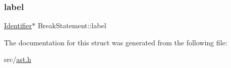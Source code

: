 \subsubsection{\texorpdfstring{label}{label}}
{\footnotesize\ttfamily \hyperlink{struct_identifier}{Identifier}$\ast$ Break\+Statement\+::label}



The documentation for this struct was generated from the following file\+:\begin{DoxyCompactItemize}
\item 
src/\hyperlink{ast_8h}{ast.\+h}\end{DoxyCompactItemize}
